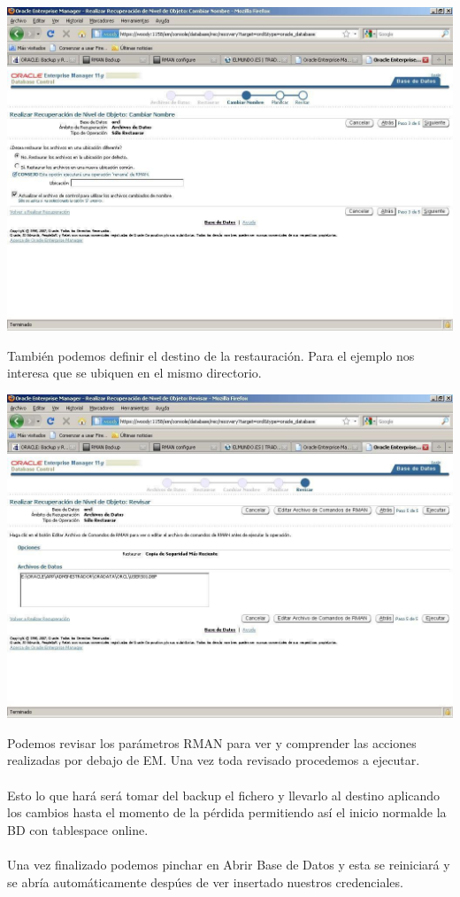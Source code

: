\documentclass[12pt,letterpaper]{article}
\begin{document}
\includegraphics[width=20cm]{./IMG/img35.png}

\begin{enumerate}
También podemos definir el destino de la restauración. Para el ejemplo nos interesa que se ubiquen en el mismo directorio. \\
\end{enumerate}

\newpage

\includegraphics[width=20cm]{./IMG/img36.png}
\begin{enumerate}
Podemos revisar los parámetros RMAN para ver y comprender las acciones realizadas por debajo de EM. Una vez toda revisado procedemos a ejecutar. \\
\\
Esto lo que hará será tomar del backup el fichero y llevarlo al destino aplicando los cambios hasta el momento de la pérdida permitiendo así el inicio normalde la BD con tablespace online. \\
\\
Una vez finalizado podemos pinchar en Abrir Base de Datos y esta se reiniciará y se abría automáticamente despúes de ver insertado nuestros credenciales. \\
\\
\end{enumerate}
\end{document}
